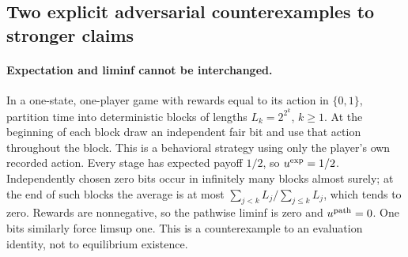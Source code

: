 \documentclass[11pt,a4paper]{article}
\theoremstyle{definition}
\theoremstyle{remark}
\begin{document}
\subsection{Two explicit adversarial counterexamples to stronger claims}
\paragraph{Expectation and liminf cannot be interchanged.}
In a one-state, one-player game with rewards equal to its action in $\{0,1\}$, partition time into deterministic blocks of lengths $L_k=2^{2^k}$, $k\geq1$. At the beginning of each block draw an independent fair bit and use that action throughout the block. This is a behavioral strategy using only the player's own recorded action. Every stage has expected payoff $1/2$, so $u^{\rm exp}=1/2$. Independently chosen zero bits occur in infinitely many blocks almost surely; at the end of such blocks the average is at most $\sum_{j<k}L_j/\sum_{j\leq k}L_j$, which tends to zero. Rewards are nonnegative, so the pathwise liminf is zero and $u^{\rm path}=0$. One bits similarly force limsup one. This is a counterexample to an evaluation identity, not to equilibrium existence.
\end{document}
